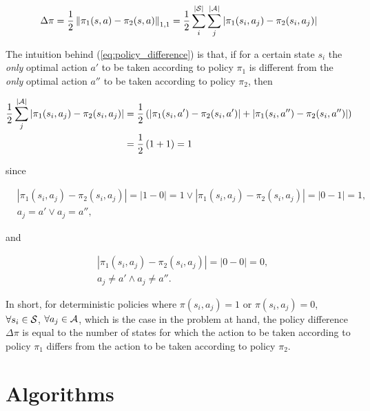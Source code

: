 \documentclass[a4paper]{article}
\begin{document}
\begin{align}
\label{eq:policy_difference}
\Delta \pi  = \frac{1}{2}  \left\| {\pi_{1} (s,a) - \pi_{2} (s,a)} \right\|_{1,1} = \frac{1}{2}  \sum\limits_{i}^{|{\cal S}|} \sum\limits_{j}^{|{\cal A}|} {\left| \pi_{1} (s_i, a_j) - \pi_{2} (s_i, a_j) \right|}
\end{align}

The intuition behind (\ref{eq:policy_difference}) is that, if for a certain state $s_i$ the \textit{only} optimal action $a'$ to be taken according to policy $\pi_1$ is different from the \textit{only} optimal action $a''$ to be taken according to policy $\pi_2$, then

\begin{align*}
\label{eq:policy_difference_explained1}
\frac{1}{2} \sum\limits_{j}^{|{\cal A}|} {\left| \pi_{1} (s_i, a_j) - \pi_{2} (s_i, a_j) \right|} &= \frac{1}{2} \left( \left| \pi_{1} (s_i, a') - \pi_{2} (s_i, a') \right| + \left| \pi_{1} (s_i, a'') - \pi_{2} (s_i, a'') \right| \right) \\ &= \frac{1}{2} \left(1 + 1\right) = 1
\end{align*}

since

\begin{align*}
& \left| \pi_{1} (s_i, a_j) - \pi_{2} (s_i, a_j) \right| = \left| 1 - 0 \right| = 1 \vee \left| \pi_{1} (s_i, a_j) - \pi_{2} (s_i, a_j) \right| = \left| 0 - 1 \right| = 1, \\
& a_j = a' \vee a_j = a'',
\end{align*}

and

\begin{align*}
& \left| \pi_{1} (s_i, a_j) - \pi_{2} (s_i, a_j) \right| = \left| 0 - 0 \right| = 0, \\
& a_j \ne a' \wedge a_j \ne a''. 
\end{align*}

In short, for deterministic policies where $\pi (s_i,a_j) = 1$ or $\pi (s_i,a_j) = 0$, $\forall s_i \in {\cal S}$, $\forall a_j \in {\cal A}$, which is the case in the problem at hand, the policy difference $\Delta \pi$ is equal to the number of states for which the action to be taken according to policy $\pi_{1}$ differs from the action to be taken according to policy $\pi_{2}$.


\vfill
\newpage
\section{Algorithms}
\end{document}
